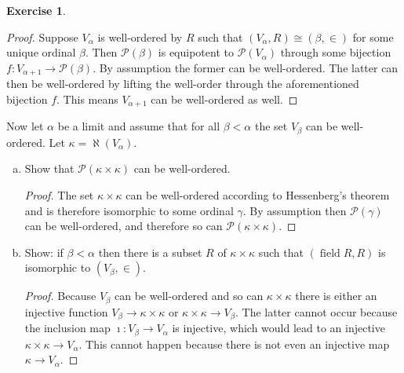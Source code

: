 \documentclass{article}
\theoremstyle{definition}
\newtheorem{question}{Exercise}
\newcommand{\powset}{\mathcal{P}}
\DeclareMathOperator{\field}{field}
\begin{document}
\begin{question}
\begin{enumerate}[a.]
              \begin{proof}
                  Suppose \(V_{\alpha}\) is well-ordered by \(R\) such that
                  \((V_{\alpha},R)\cong(\beta,\in)\) for some unique ordinal
                  \(\beta\). Then \(\powset(\beta)\) is equipotent to
                  \(\powset(V_{\alpha})\) through some bijection
                  \(f:V_{\alpha+1}\to\powset(\beta)\). By assumption the former
                  can be well-ordered. The latter can then be well-ordered by
                  lifting the well-order through the aforementioned bijection
                  \(f\). This means \(V_{\alpha+1}\) can be well-ordered as
                  well.
              \end{proof}
    \end{enumerate}
    Now let \(\alpha\) be a limit and assume that for all \(\beta<\alpha\) the
    set \(V_{\beta}\) can be well-ordered. Let \(\kappa=\aleph(V_{\alpha})\).
    \begin{enumerate}[a., resume]
        \item Show that \(\powset(\kappa\times\kappa)\) can be well-ordered.

              \begin{proof}
                  The set \(\kappa\times\kappa\) can be well-ordered according
                  to Hessenberg's theorem and is therefore isomorphic to some
                  ordinal \(\gamma\). By assumption then \(\powset(\gamma)\) can
                  be well-ordered, and therefore so can
                  \(\powset(\kappa\times\kappa)\).
              \end{proof}

        \item Show: if \(\beta<\alpha\) then there is a subset \(R\) of
              \(\kappa\times\kappa\) such that \((\field R, R)\) is isomorphic
              to \((V_{\beta},\in)\).

              \begin{proof}
                  Because \(V_{\beta}\) can be well-ordered and so can
                  \(\kappa\times\kappa\) there is either an injective function
                  \(V_{\beta}\to\kappa\times\kappa\) or \(\kappa\times\kappa\to
                  V_{\beta}\). The latter cannot occur because the inclusion map
                  \(\imath:V_{\beta}\to V_{\alpha}\) is injective, which would
                  lead to an injective \(\kappa\times\kappa\to V_{\alpha}\).
                  This cannot happen because there is not even an injective map
                  \(\kappa\to V_{\alpha}\).


\end{proof}
\end{enumerate}
\end{question}
\end{document}

